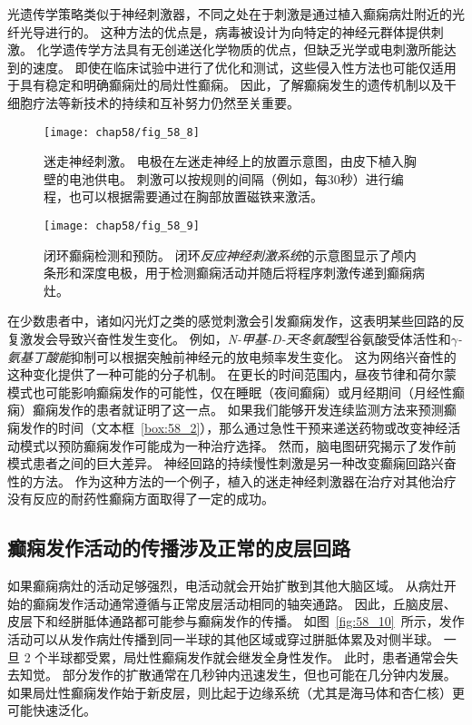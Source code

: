 \begin{proposition}[实时检测和预防癫痫的新方法]
	\quad \quad 光遗传学策略类似于神经刺激器，不同之处在于刺激是通过植入癫痫病灶附近的光纤光导进行的。
	这种方法的优点是，病毒被设计为向特定的神经元群体提供刺激。
	化学遗传学方法具有无创递送化学物质的优点，但缺乏光学或电刺激所能达到的速度。
	即使在临床试验中进行了优化和测试，这些侵入性方法也可能仅适用于具有稳定和明确癫痫灶的局灶性癫痫。
	因此，了解癫痫发生的遗传机制以及干细胞疗法等新技术的持续和互补努力仍然至关重要。
	
\end{proposition}


\begin{figure}[htbp]
	\centering
	\texttt{[image: chap58/fig\_58\_8]}
	\caption{迷走神经刺激。
		电极在左迷走神经上的放置示意图，由皮下植入胸壁的电池供电。
		刺激可以按规则的间隔（例如，每30秒）进行编程，也可以根据需要通过在胸部放置磁铁来激活\cite{stacey2008technology}。}
	\label{fig:58_8}
\end{figure}


\begin{figure}[htbp]
	\centering
	\texttt{[image: chap58/fig\_58\_9]}
	\caption{闭环癫痫检测和预防。
		闭环\textit{反应神经刺激系统}的示意图显示了颅内条形和深度电极，用于检测癫痫活动并随后将程序刺激传递到癫痫病灶\cite{heck2014two}。}
	\label{fig:58_9}
\end{figure}



在少数患者中，诸如闪光灯之类的感觉刺激会引发癫痫发作，这表明某些回路的反复激发会导致兴奋性发生变化。
例如，\textit{N-甲基-D-天冬氨酸}型谷氨酸受体活性和\textit{$\gamma$-氨基丁酸能}抑制可以根据突触前神经元的放电频率发生变化。
这为网络兴奋性的这种变化提供了一种可能的分子机制。
在更长的时间范围内，昼夜节律和荷尔蒙模式也可能影响癫痫发作的可能性，仅在睡眠（夜间癫痫）或月经期间（月经性癫痫）癫痫发作的患者就证明了这一点。
如果我们能够开发连续监测方法来预测癫痫发作的时间（文本框~\ref{box:58_2}），那么通过急性干预来递送药物或改变神经活动模式以预防癫痫发作可能成为一种治疗选择。
然而，脑电图研究揭示了发作前模式患者之间的巨大差异。
神经回路的持续慢性刺激是另一种改变癫痫回路兴奋性的方法。
作为这种方法的一个例子，植入的迷走神经刺激器在治疗对其他治疗没有反应的耐药性癫痫方面取得了一定的成功。



\subsection{癫痫发作活动的传播涉及正常的皮层回路}

如果癫痫病灶的活动足够强烈，电活动就会开始扩散到其他大脑区域。
从病灶开始的癫痫发作活动通常遵循与正常皮层活动相同的轴突通路。
因此，丘脑皮层、皮层下和经胼胝体通路都可能参与癫痫发作的传播。
如图~\ref{fig:58_10}~所示，发作活动可以从发作病灶传播到同一半球的其他区域或穿过胼胝体累及对侧半球。
一旦 2 个半球都受累，局灶性癫痫发作就会继发全身性发作。
此时，患者通常会失去知觉。
部分发作的扩散通常在几秒钟内迅速发生，但也可能在几分钟内发展。
如果局灶性癫痫发作始于新皮层，则比起于边缘系统（尤其是海马体和杏仁核）更可能快速泛化。


